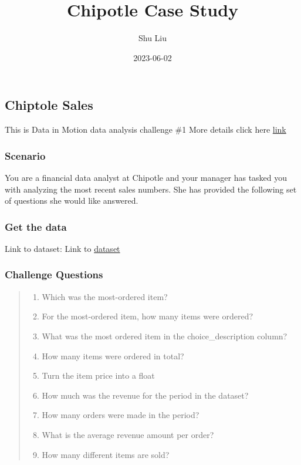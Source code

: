 \documentclass[
]{article}
\title{Chipotle Case Study}
\author{Shu Liu}
\date{2023-06-02}
\providecommand{\tightlist}{%
  \setlength{\itemsep}{0pt}\setlength{\parskip}{0pt}}
\begin{document}
\maketitle

\hypertarget{chiptole-sales}{%
\subsection{Chiptole Sales}\label{chiptole-sales}}

This is Data in Motion data analysis challenge \#1 More details click
here
\href{https://d-i-motion.com/lessons/challenge-1-chipotle-sales/}{link}

\hypertarget{scenario}{%
\subsubsection{Scenario}\label{scenario}}

You are a financial data analyst at Chipotle and your manager has tasked
you with analyzing the most recent sales numbers. She has provided the
following set of questions she would like answered.

\hypertarget{get-the-data}{%
\subsubsection{Get the data}\label{get-the-data}}

Link to dataset: Link to
\href{https://raw.githubusercontent.com/justmarkham/DAT8/master/data/chipotle.tsv}{dataset}

\hypertarget{challenge-questions}{%
\subsubsection{Challenge Questions}\label{challenge-questions}}

\begin{quote}
\begin{enumerate}
\def\labelenumi{\arabic{enumi}.}
\tightlist
\item
  Which was the most-ordered item?
\item
  For the most-ordered item, how many items were ordered?
\item
  What was the most ordered item in the choice\_description column?
\item
  How many items were ordered in total?
\item
  Turn the item price into a float
\item
  How much was the revenue for the period in the dataset?
\item
  How many orders were made in the period?
\item
  What is the average revenue amount per order?
\item
  How many different items are sold?
\end{enumerate}
\end{quote}
\end{document}
